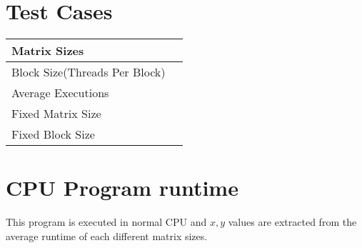 \documentclass[12pt,oneside,a4paper]{article}
\title{\titlefont{Matrix Multiplication Runtime}}
\author{M.A.S SURANGA (CST140043)}
\date{}
\begin{document}
	\maketitle

	\vspace*{5\baselineskip} 
	\begin{center}
	\end{center}

	\newpage

	\tableofcontents

	\newpage
	\section{Test Cases}
	\hfill \break

	\begin{tabu} to 1 \textwidth { | X[l] | X[r] | }
		 \hline
		 Matrix Sizes &   \\
		 \hline
		 Block Size(Threads Per Block) &   \\
		 \hline
		 Average Executions &   \\
		 \hline
		 Fixed Matrix Size &   \\
		 \hline
		 Fixed Block Size &   \\ 
		 \hline
	\end{tabu}	
	

	\newpage

	\section{CPU Program runtime}

	\par
	This program is executed in normal CPU and $x,y$ values are extracted from the average runtime of each different matrix sizes.
	\hfill \break


	\newpage
\end{document}
